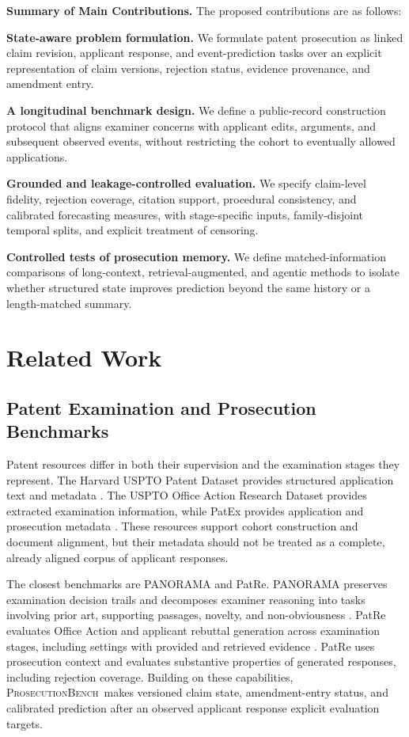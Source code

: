 \documentclass[11pt]{article}
\providecommand{\Section}{\section}
\newcommand{\bench}{\textsc{ProsecutionBench}}
\begin{document}
\medskip\noindent\textbf{Summary of Main Contributions.}
The proposed contributions are as follows:
\begin{compactitem}
    \item \textbf{State-aware problem formulation.} We formulate patent prosecution as linked claim revision, applicant response, and event-prediction tasks over an explicit representation of claim versions, rejection status, evidence provenance, and amendment entry.
    \item \textbf{A longitudinal benchmark design.} We define a public-record construction protocol that aligns examiner concerns with applicant edits, arguments, and subsequent observed events, without restricting the cohort to eventually allowed applications.
    \item \textbf{Grounded and leakage-controlled evaluation.} We specify claim-level fidelity, rejection coverage, citation support, procedural consistency, and calibrated forecasting measures, with stage-specific inputs, family-disjoint temporal splits, and explicit treatment of censoring.
    \item \textbf{Controlled tests of prosecution memory.} We define matched-information comparisons of long-context, retrieval-augmented, and agentic methods to isolate whether structured state improves prediction beyond the same history or a length-matched summary.
\end{compactitem}

\Section{Related Work}\label{sec:related-work}

\subsection{Patent Examination and Prosecution Benchmarks}
\label{sec:rw-patent-examination}

Patent resources differ in both their supervision and the examination stages they represent. The Harvard USPTO Patent Dataset provides structured application text and metadata \citep{suzgun2023hupd}. The USPTO Office Action Research Dataset provides extracted examination information, while PatEx provides application and prosecution metadata \citep{uspto2017officeactions,uspto2022patex}. These resources support cohort construction and document alignment, but their metadata should not be treated as a complete, already aligned corpus of applicant responses.

The closest benchmarks are PANORAMA and PatRe. PANORAMA preserves examination decision trails and decomposes examiner reasoning into tasks involving prior art, supporting passages, novelty, and non-obviousness \citep{lim2025panorama}. PatRe evaluates Office Action and applicant rebuttal generation across examination stages, including settings with provided and retrieved evidence \citep{wang2026patre}. PatRe uses prosecution context and evaluates substantive properties of generated responses, including rejection coverage. Building on these capabilities, \bench\ makes versioned claim state, amendment-entry status, and calibrated prediction after an observed applicant response explicit evaluation targets.
\end{document}

